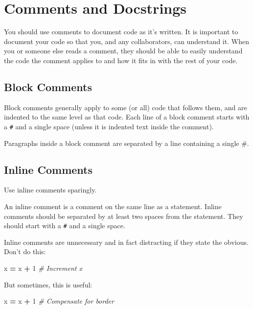 \documentclass[
]{book}
\newenvironment{Shaded}{\begin{snugshade}}{\end{snugshade}}
\newcommand{\CommentTok}[1]{\textcolor[rgb]{0.56,0.35,0.01}{\textit{#1}}}
\newcommand{\DecValTok}[1]{\textcolor[rgb]{0.00,0.00,0.81}{#1}}
\newcommand{\NormalTok}[1]{#1}
\newcommand{\OperatorTok}[1]{\textcolor[rgb]{0.81,0.36,0.00}{\textbf{#1}}}
\begin{document}
\hypertarget{comments-and-docstrings}{%
\section{Comments and Docstrings}\label{comments-and-docstrings}}

You should use comments to document code as it's written. It is important to
document your code so that you, and any collaborators, can understand it. When
you or someone else reads a comment, they should be able to easily understand
the code the comment applies to and how it fits in with the rest of your code.

\hypertarget{block-comments}{%
\subsection{Block Comments}\label{block-comments}}

Block comments generally apply to some (or all) code that follows them, and are
indented to the same level as that code. Each line of a block comment starts
with a \texttt{\#} and a single space (unless it is indented text inside the comment).

Paragraphs inside a block comment are separated by a line containing a single \#.

\hypertarget{inline-comments}{%
\subsection{Inline Comments}\label{inline-comments}}

Use inline comments sparingly.

An inline comment is a comment on the same line as a statement. Inline comments
should be separated by at least two spaces from the statement. They should start
with a \texttt{\#} and a single space.

Inline comments are unnecessary and in fact distracting if they state the
obvious. Don't do this:

\begin{Shaded}
\begin{Highlighting}[]
\NormalTok{x }\OperatorTok{=}\NormalTok{ x }\OperatorTok{+} \DecValTok{1}                 \CommentTok{# Increment x}
\end{Highlighting}
\end{Shaded}

But sometimes, this is useful:

\begin{Shaded}
\begin{Highlighting}[]
\NormalTok{x }\OperatorTok{=}\NormalTok{ x }\OperatorTok{+} \DecValTok{1}                 \CommentTok{# Compensate for border}
\end{Highlighting}
\end{Shaded}
\end{document}
